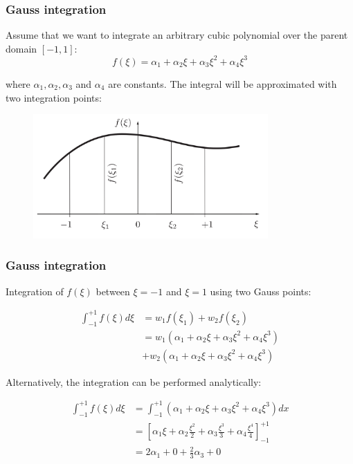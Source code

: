 \documentclass[notes]{beamer}
\begin{document}
\begin{frame}
\frametitle{Gauss integration}
Assume that we want to integrate an arbitrary cubic polynomial over the parent domain $[-1, 1]$:
\begin{equation*}
f(\xi) = \alpha_1 + \alpha_2 \xi + \alpha_3 \xi^2 + \alpha_4 \xi^3
\end{equation*}

where $\alpha_1, \alpha_2, \alpha_3$ and $\alpha_4$ are constants. The integral will be approximated with two integration points:
\begin{figure}[ht]
	\centering
	\includegraphics[width=0.8\textwidth]{figs/gauss-derivation.png}
\end{figure}
\end{frame}

\begin{frame}
\frametitle{Gauss integration}
Integration of $f(\xi)$ between $\xi = -1$ and $\xi = 1$ using two Gauss points:

\begin{align*}
	\int_{-1}^{+1}f(\xi) d\xi & = w_1 f(\xi_1) + w_2 f(\xi_2) \\
	& = w_1(\alpha_1 + \alpha_2 \xi + \alpha_3 \xi^2 + \alpha_4 \xi^3) \\
	& + w_2(\alpha_1 + \alpha_2 \xi + \alpha_3 \xi^2 + \alpha_4 \xi^3)
\end{align*}

Alternatively, the integration can be performed analytically:

\begin{align*}
	\int_{-1}^{+1}f(\xi) d\xi & = \int_{-1}^{+1}(\alpha_1 + \alpha_2 \xi + \alpha_3 \xi^2 + \alpha_4 \xi^3) dx \\
	& = \left[ \alpha_1 \xi + \alpha_2 \frac{\xi^2}{2} + \alpha_3 \frac{\xi^3}{3} + \alpha_4 \frac{\xi^4}{4} \right]_{-1}^{+1} \\
	& = 2 \alpha_1 + 0 + \frac{2}{3} \alpha_3 + 0
\end{align*}
\end{frame}
\end{document}
